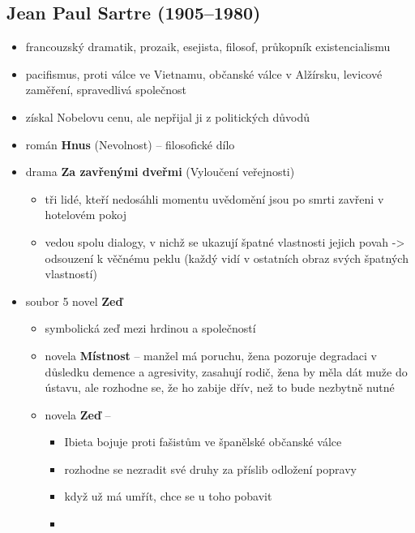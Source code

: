 \subsection{Jean Paul Sartre (1905--1980)}
\begin{itemize}
\item francouzský dramatik, prozaik, esejista, filosof, průkopník existencialismu
\item pacifismus, proti válce ve Vietnamu, občanské válce v Alžírsku, levicové zaměření, spravedlivá společnost
\item získal Nobelovu cenu, ale nepřijal ji z politických důvodů
\item román \textbf{Hnus} (Nevolnost) -- filosofické dílo
\item drama \textbf{Za zavřenými dveřmi} (Vyloučení veřejnosti)
	\begin{itemize}
	\item tři lidé, kteří nedosáhli momentu uvědomění jsou po smrti zavřeni v hotelovém pokoj
	\item vedou spolu dialogy, v nichž se ukazují špatné vlastnosti jejich povah -> odsouzení k věčnému peklu (každý vidí v ostatních obraz svých špatných vlastností)
	\end{itemize}
\item soubor 5 novel \textbf{Zeď}
	\begin{itemize}
	\item symbolická zeď mezi hrdinou a společností
	\item novela \textbf{Místnost} -- manžel má poruchu, žena pozoruje degradaci v důsledku demence a agresivity, zasahují rodič, žena by měla dát muže do ústavu, ale rozhodne se, že ho zabije dřív, než to bude nezbytně nutné
	\item novela \textbf{Zeď} -- 
		\begin{itemize}
		\item Ibieta bojuje proti fašistům ve španělské občanské válce
		\item rozhodne se nezradit své druhy za příslib odložení popravy
		\item když už má umřít, chce se u toho pobavit
		\item 
		\end{itemize}
	\end{itemize}



\end{itemize}


